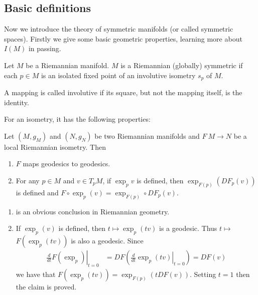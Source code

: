 \subsection{Basic definitions}

Now we introduce the theory of symmetric manifolds (or called
symmetric spaces). Firstly we give some basic geometric
properties, learning more about $I(M)$ in passing.

\begin{definition}
Let $M$ be a Riemannian manifold. $M$ is a  Riemannian (globally)
symmetric
if each $p \in M$ is an isolated fixed point of an involutive
isometry $s_{p}$ of $M$.	
\end{definition}
\begin{definition}
	A mapping is called involutive if its square, but not the
	mapping itself, is
	the identity.
\end{definition}
For an isometry, it has the following properties:
\begin{lemma}\label{31}
	Let $\left( M, g_{M} \right)$ and $\left( N, g_{N} \right)$
	be two Riemannian manifolds and $F\: M \rightarrow N$ be a
	local Riemannian isometry. Then
	
  \begin{enumerate}
    \item $F$ maps geodesics to geodesics.
    
    \item For any $p \in M$ and $v \in T_{p} M$, if $\exp _{p} v$
    is defined, then $\exp _{F(p)}\left( D F_{p}(v) \right)$ is
    defined and $F \circ \exp _{p}(v) = \exp _{F(p)} \circ D
    F_{p}(v) .$ \qedhere
  \end{enumerate}
\end{lemma}
\bproof \hfill
\begin{enumerate}
  \item is an obvious conclusion in Riemannian geometry.

  \item If $\exp _{p}(v)$ is defined, then $t \mapsto \exp _{p}(t v)$
  is a geodesic. Thus $t \mapsto$ $F\left( \exp _{p}(t v) \right)$
  is also a geodesic. Since
  \[
  \begin{aligned}
    \left.\frac{d}{d t} F\left( \exp _{p}
    \right)\right|_{t=0} &=D F\left( \left .\frac{d}{d t} \exp
    _{p}(t v) \right|_{t=0} \right) =D F(v)
  \end{aligned}
  \]
  we have that $F\left( \exp _{p}(t v) \right)=\exp _{F(p)}(t D
  F(v))$. Setting $t=1$ then the claim is proved.
\end{enumerate}
